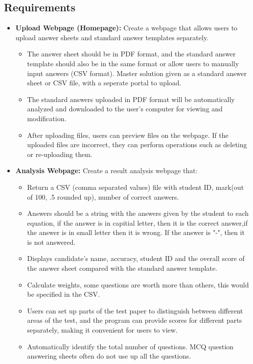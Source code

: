 \documentclass[twocolumn]{article}
\begin{document}
    \subsection{Requirements}
    \begin{itemize}
    \item\textbf{Upload Webpage (Homepage):} Create a webpage that allows users to upload answer sheets and standard answer templates separately. 
    \begin{itemize}
        \item The answer sheet should be in PDF format, and the standard answer template should also be in the same format or allow users to manually input answers (CSV format). Master solution given as a standard answer sheet or CSV file, with a seperate portal to upload.
        \item The standard answers uploaded in PDF format will be automatically analyzed and downloaded to the user's computer for viewing and modification.
        \item After uploading files, users can preview files on the webpage. If the uploaded files are incorrect, they can perform operations such as deleting or re-uploading them.
    \end{itemize}
    \item \textbf{Analysis Webpage:} Create a result analysis webpage that:
    \begin{itemize}
        \item Return a CSV (comma separated values) file with student ID, mark(out of 100, .5 rounded up), number of correct answers.
        \item Answers should be a string with the answers given by the student to each equation, if the answer is in capitial letter, then it is the correct answer,if the answer is in small letter then it is wrong. If the answer is "-", then it is not answered.
        \item Displays candidate's name, accuracy, student ID and the overall score of the answer sheet compared with the standard answer template.
        \item Calculate weights, some questions are worth more than others, this would be specified in the CSV.
        \item Users can set up parts of the test paper to distinguish between different areas of the test, and the program can provide scores for different parts separately, making it convenient for users to view.
        \item Automatically identify the total number of questions. MCQ question answering sheets often do not use up all the questions.

\end{itemize}
\end{itemize}
\end{document}

